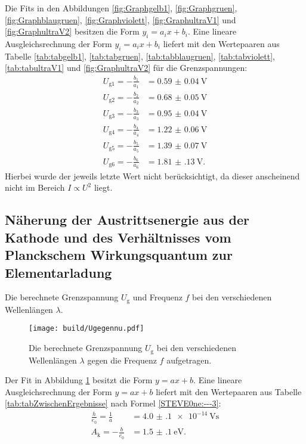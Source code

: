 Die Fits in den Abbildungen \ref{fig:Graphgelb1}, \ref{fig:Graphgruen}, \ref{fig:Graphblaugruen}, \ref{fig:Graphviolett}, \ref{fig:GraphultraV1} und \ref{fig:GraphultraV2} besitzen die Form $y_i=a_i x + b_i$. Eine lineare Ausgleichsrechnung der Form $y_i=a_i x+b_i$ liefert mit den Wertepaaren aus Tabelle \ref{tab:tabgelb1}, \ref{tab:tabgruen}, \ref{tab:tabblaugruen}, \ref{tab:tabviolett}, \ref{tab:tabultraV1} und \ref{fig:GraphultraV2} für die Grenzspannungen:
\begin{align}
	U_{\text{g}1} = -\frac{b_1}{a_1} &= \SI{0.59(4)}{\volt}\\
	U_{\text{g}2} = -\frac{b_2}{a_2} &= \SI{0.68(5)}{\volt}\\
	U_{\text{g}3} = -\frac{b_3}{a_3} &= \SI{0.95(4)}{\volt}\\
	U_{\text{g}4} = -\frac{b_4}{a_4} &= \SI{1.22(6)}{\volt}\\
	U_{\text{g}5} = -\frac{b_5}{a_5} &= \SI{1.39(7)}{\volt}\\
	U_{\text{g}6} = -\frac{b_6}{a_6} &= \SI{1.81(13)}{\volt}\text{.}
\end{align}
Hierbei wurde der jeweils letzte Wert nicht berücksichtigt, da dieser anscheinend nicht im Bereich $I\propto U^2$ liegt.

\subsection{Näherung der Austrittsenergie aus der Kathode und des Verhältnisses vom Planckschem Wirkungsquantum zur Elementarladung}
\begin{table}
	\centering
	\caption{Die berechnete Grenzspannung $U_\text{g}$ und Frequenz $f$ bei den verschiedenen Wellenlängen $\lambda$.}
  	
\end{table}
\begin{figure}
	\centering
	\caption{Die berechnete Grenzspannung $U_\text{g}$ bei den verschiedenen Wellenlängen $\lambda$ gegen die Frequenz $f$ aufgetragen.}
	\texttt{[image: build/Ugegennu.pdf]}
	\label{fig:GraphUgegennu}
\end{figure}
Der Fit in Abbildung \ref{fig:GraphUgegennu} besitzt die Form $y=a x + b$. Eine lineare Ausgleichsrechnung der Form $y=a x + b$ liefert mit den Wertepaaren aus Tabelle \ref{tab:tabZwischenErgebnisse} nach Formel \eqref{STEVE0ne:---3}:
\begin{align}
	\frac{h}{e_0}=\frac{1}{a} &= \SI{4.0(1)e-14}{\volt\second}\\
	A_\text{k}=-\frac{b}{e_0} &= \SI{1.5(1)}{\electronvolt}\text{.}
\end{align}
 

